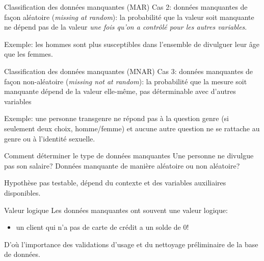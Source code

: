 \documentclass[
  ignorenonframetext,
]{beamer}
\providecommand{\tightlist}{%
  \setlength{\itemsep}{0pt}\setlength{\parskip}{0pt}}\usepackage{longtable,booktabs,array}
\begin{document}
\begin{frame}{Classification des données manquantes (MAR)}
\protect\hypertarget{classification-des-donnuxe9es-manquantes-mar}{}
Cas 2: données manquantes de façon aléatoire (\emph{missing at random}):
la probabilité que la valeur soit manquante ne dépend pas de la valeur
\emph{une fois qu'on a contrôlé pour les autres variables}.

Exemple: les hommes sont plus susceptibles dans l'ensemble de divulguer
leur âge que les femmes.
\end{frame}

\begin{frame}{Classification des données manquantes (MNAR)}
\protect\hypertarget{classification-des-donnuxe9es-manquantes-mnar}{}
Cas 3: données manquantes de façon non-aléatoire (\emph{missing not at
random}): la probabilité que la mesure soit manquante dépend de la
valeur elle-même, pas déterminable avec d'autres variables

Exemple: une personne transgenre ne répond pas à la question genre (si
seulement deux choix, homme/femme) et aucune autre question ne se
rattache au genre ou à l'identité sexuelle.
\end{frame}

\begin{frame}{Comment déterminer le type de données manquantes}
\protect\hypertarget{comment-duxe9terminer-le-type-de-donnuxe9es-manquantes}{}
Une personne ne divulgue pas son salaire? Données manquante de manière
aléatoire ou non aléatoire?

Hypothèse pas testable, dépend du contexte et des variables auxiliaires
disponibles.
\end{frame}

\begin{frame}{Valeur logique}
\protect\hypertarget{valeur-logique}{}
Les données manquantes ont souvent une valeur logique:

\begin{itemize}
\tightlist
\item
  un client qui n'a pas de carte de crédit a un solde de 0!
\end{itemize}

D'où l'importance des validations d'usage et du nettoyage préliminaire
de la base de données.
\end{frame}
\end{document}
